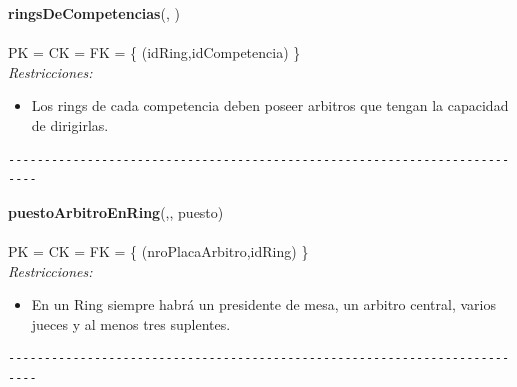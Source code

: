 \noindent\textbf{ringsDeCompetencias}(, )
\\
\\
PK = CK = FK = \{ (idRing,idCompetencia) \} \\

\textit{Restricciones:}
\begin{itemize}
	\item Los rings de cada competencia deben poseer arbitros que tengan la capacidad de dirigirlas.
\end{itemize}

\begin{verbatim}
--------------------------------------------------------------------------
\end{verbatim}

\noindent\textbf{puestoArbitroEnRing}(,, puesto)
\\
\\
PK = CK = FK = \{ (nroPlacaArbitro,idRing) \} \\

\textit{Restricciones:}
\begin{itemize}
	\item En un Ring siempre habrá un presidente de mesa, un arbitro central, varios jueces y al menos tres suplentes.
\end{itemize}

\begin{verbatim}
--------------------------------------------------------------------------
\end{verbatim}
